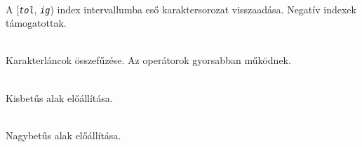 \begin{frame}
  \begin{description}[m]
    \item[\texttt{slice(\emph{tol}[, \emph{ig}])}] \hfill \\ A [\texttt{\emph{tol}}, \texttt{\emph{ig}}) index intervallumba eső karaktersorozat visszaadása. Negatív indexek támogatottak.
    \begin{exampleblock}{}
    
  \end{exampleblock}
  \end{description}
\end{frame}

\begin{frame}
  \begin{description}[m]
    \item[\texttt{concat(\emph{s1}[, \emph{s2}[, \dots[, \emph{sN}]]])}, \texttt{$+$}, \texttt{$+=$}] \hfill \\ Karakterláncok összefűzése. Az operátorok gyorsabban működnek.
    \item[\texttt{toLowerCase()}] \hfill \\ Kisbetűs alak előállítása.
    \item[\texttt{toUpperCase()}] \hfill \\ Nagybetűs alak előállítása.
    \footnotesize
    \begin{exampleblock}{}
    
  \end{exampleblock}
  \end{description}
\end{frame}

